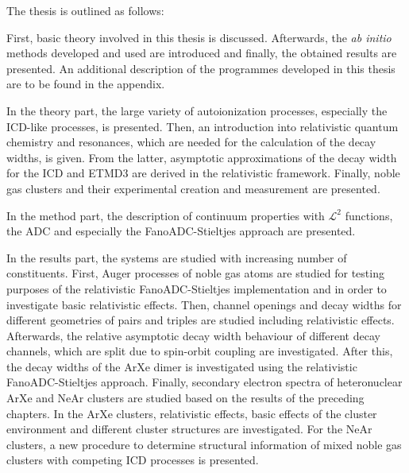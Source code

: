 The thesis is outlined as follows:

First, basic theory involved in this thesis is discussed. Afterwards, the
\emph{ab initio} methods developed and used are introduced and
finally, the obtained results are presented.
An additional description of the programmes developed in this thesis are to
be found in the appendix.

In the theory part, the large variety of autoionization processes,
especially the \ac{ICD}-like processes, is presented. Then, an introduction
into relativistic quantum chemistry and resonances, which are needed for
the calculation of the decay widths, is given. From the latter, asymptotic
approximations of the decay width for the \ac{ICD} and ETMD3 are derived
in the relativistic framework.
Finally, noble gas clusters and their experimental creation and measurement
are presented.

In the method part, the description of continuum properties with $\mathcal{L}^2$
functions, the \ac{ADC} and especially the FanoADC-Stieltjes approach are
presented.

In the results part, the systems are studied with increasing number of constituents.
First, Auger processes of noble gas atoms are studied for testing purposes
of the relativistic FanoADC-Stieltjes implementation and in order to investigate
basic relativistic effects. Then, channel openings and decay widths for
different geometries of pairs and triples are studied including relativistic
effects. Afterwards, the relative asymptotic decay width behaviour
of different decay channels, which are split due to spin-orbit coupling are
investigated. After this, the decay widths of the ArXe dimer is investigated
using the relativistic FanoADC-Stieltjes approach. Finally, secondary electron
spectra of heteronuclear ArXe and NeAr clusters are studied based on the
results of the preceding chapters.
In the ArXe clusters, relativistic effects, basic effects of the cluster environment
and different cluster structures are investigated.
For the NeAr clusters, a new procedure to determine structural information of mixed
noble gas clusters with competing \ac{ICD} processes is presented.
